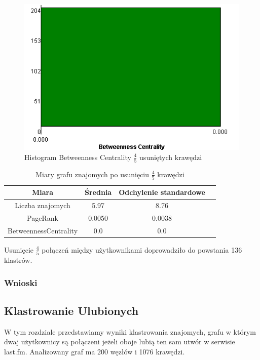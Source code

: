 \documentclass[10pt,a4paper]{article}
\begin{document}
\begin{figure}[H]
\centering
\caption{Histogram Betweenness Centrality $\frac{4}{5}$ usuniętych krawędzi}
\includegraphics[scale=0.6]{wyniki/final200Friends/4200friendsBCHist.png}
\end{figure}


\begin{table}[H]
  \caption{Miary grafu znajomych po usunięciu  $\frac{4}{5}$ krawędzi}
  \centering
    \begin{tabular}{cccc}
    \addlinespace
    \toprule
    Miara & Średnia  & Odchylenie standardowe \\
    \midrule
    Liczba znajomych & 5.97 & 8.76 \\
    PageRank & 0.0050 & 0.0038
 \\
    BetweennessCentrality & 0.0 & 0.0\\ 
    \bottomrule
    \end{tabular}
  \label{tab:addlabel}
\end{table}

Usunięcie $\frac{4}{5}$ połączeń między użytkownikami doprowadziło do powstania 136 klastrów. 
\subsubsection {Wnioski}


\subsection {Klastrowanie Ulubionych}
  W tym rozdziale przedstawiamy wyniki klastrowania znajomych, grafu w którym dwaj użytkownicy są połączeni jeżeli oboje lubią ten sam utwór w serwisie last.fm. Analizowany graf ma 200 węzłów i 1076 krawędzi.
\end{document}
